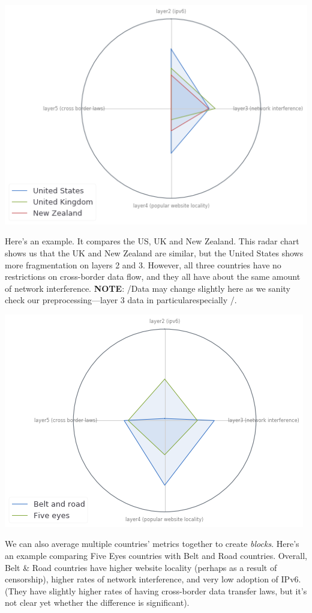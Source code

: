 \documentclass[11pt]{article}
\begin{document}
\begin{center}
\includegraphics[width=.9\linewidth]{./figures/us-uk-nz.png}
\end{center}

Here's an example. It compares the US, UK and New Zealand. This radar chart
shows us that the UK and New Zealand are similar, but the United States shows
more fragmentation on layers 2 and 3. However, all three countries have no
restrictions on cross-border data flow, and they all have about the same amount
of network interference. \textbf{NOTE}: /Data may change slightly here as we sanity
check our preprocessing---layer 3 data in particularespecially /.


\begin{center}
\includegraphics[width=.9\linewidth]{./figures/belt-and-road.png}
\end{center}

We can also average multiple countries' metrics together to create \emph{blocks}.
Here's an example comparing Five Eyes countries with Belt and Road countries.
Overall, Belt \& Road countries have higher website locality (perhaps as a result
of censorship), higher rates of network interference, and very low adoption of
IPv6. (They have slightly higher rates of having cross-border data transfer laws,
but it's not clear yet whether the difference is significant).
\end{document}
